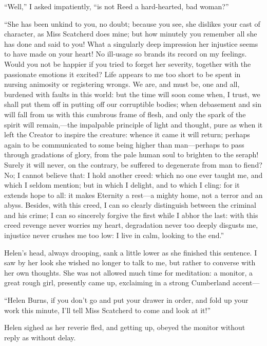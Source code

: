 \enquote{Well,} I asked impatiently, \enquote{is not \Mrs{} Reed a
hard-hearted, bad woman?}

\enquote{She has been unkind to you, no doubt; because you see, she
dislikes your cast of character, as Miss Scatcherd does mine; but how
minutely you remember all she has done and said to you!  What a
singularly deep impression her injustice seems to have made on your
heart!  No ill-usage so brands its record on my feelings.  Would you not
be happier if you tried to forget her severity, together with the
passionate emotions it excited?  Life appears to me too short to be
spent in nursing animosity or registering wrongs.  We are, and must be,
one and all, burdened with faults in this world: but the time will soon
come when, I trust, we shall put them off in putting off our corruptible
bodies; when debasement and sin will fall from us with this cumbrous
frame of flesh, and only the spark of the spirit will remain,---the
impalpable principle of light and thought, pure as when it left the
Creator to inspire the creature: whence it came it will return; perhaps
again to be communicated to some being higher than man---perhaps to pass
through gradations of glory, from the pale human soul to brighten to the
seraph!  Surely it will never, on the contrary, be suffered to
degenerate from man to fiend?  No; I cannot believe that: I hold another
creed: which no one ever taught me, and which I seldom mention; but in
which I delight, and to which I cling: for it extends hope to all: it
makes Eternity a rest---a mighty home, not a terror and an abyss. 
Besides, with this creed, I can so clearly distinguish between the
criminal and his crime; I can so sincerely forgive the first while I
abhor the last: with this creed revenge never worries my heart,
degradation never too deeply disgusts me, injustice never crushes me too
low: I live in calm, looking to the end.}

Helen's head, always drooping, sank a little lower as she finished this
sentence.  I saw by her look she wished no longer to talk to me, but
rather to converse with her own thoughts.  She was not allowed much time
for meditation: a monitor, a great rough girl, presently came up,
exclaiming in a strong Cumberland accent---

\enquote{Helen Burns, if you don't go and put your drawer in order, and
fold up your work this minute, I'll tell Miss Scatcherd to come and look
at it!}

Helen sighed as her reverie fled, and getting up, obeyed the monitor
without reply as without delay.
